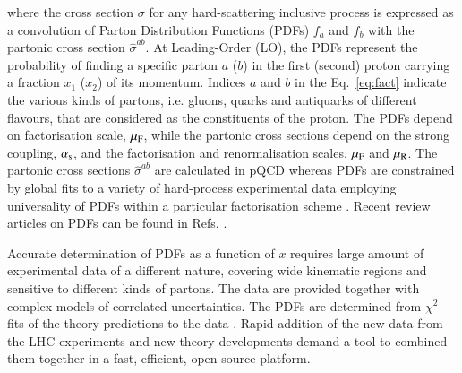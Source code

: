 where the cross section $\sigma$ for 
any hard-scattering inclusive process
is expressed
as a convolution of Parton Distribution Functions (PDFs) $f_a$ and $f_b$
with the partonic cross section
$\hat{\sigma}^{ab}$.
%
At Leading-Order (LO), the PDFs represent 
the probability of finding a specific parton $a$ ($b$) in the first (second) proton carrying a fraction $x_1$ ($x_2$) of its momentum.
%
Indices $a$ and $b$ in the Eq.~\ref{eq:fact} indicate the various 
kinds of partons,
i.e. gluons, quarks and antiquarks of different flavours, 
that are considered
as the constituents of the proton.
%
The PDFs depend on factorisation scale, $\mu_\mathrm{F}$, while the partonic cross sections depend on the strong coupling,
$\alpha_\mathrm{s}$, and the factorisation and renormalisation scales,
$\mu_\mathrm{F}$ and $\mu_\mathrm{R}$.
%
The partonic cross sections $\hat\sigma^{ab}$ are calculated in pQCD whereas
PDFs are constrained by global fits to a variety of hard-process experimental data employing
universality of PDFs within a particular factorisation scheme \cite{Collins:1981uw,Collins:1983ju,Collins:1985ue,Collins:1989gx,Collins:2011zzd}.
Recent review articles on PDFs can be found in Refs. \cite{Perez:2012um,Forte:2013wc}. 
%
%

Accurate determination of PDFs as a function of $x$ requires large amount of
experimental data of a different nature, covering wide kinematic regions
and sensitive to different kinds of partons. The data are provided together with
complex models of correlated uncertainties. The PDFs are determined
from $\chi^2$ fits of the theory predictions to the 
data \cite{MSTWpdf,CT10pdf,NNPDFpdf,Alekhin:2013nda,Jimenez-Delgado:2014twa}. 
Rapid addition of the new data from the LHC experiments and new theory developments 
demand a tool to combined them together in a fast, efficient, open-source platform.
%

